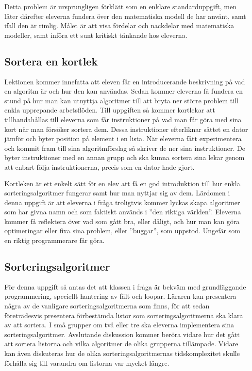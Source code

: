     \textcolor{lila}{Detta problem är ursprungligen förklätt som en enklare standarduppgift, men låter därefter eleverna fundera över den matematiska modell de har använt, samt ifall den är rimlig. Målet är att visa fördelar och nackdelar med matematiska modeller, samt införa ett sunt kritiskt tänkande hos eleverna.}
    
\subsection{Sortera en kortlek}
    \label{sec:Sortera}
    
    \textcolor{WildStrawberry}{
        Lektionen kommer innefatta att eleven får en introducerande beskrivning på vad en algoritm är och hur den kan användas. Sedan kommer eleverna få fundera en stund på hur man kan utnyttja algoritmer till att bryta ner större problem till enkla upprepande arbetsflöden. Till uppgiften så kommer kortlekar att tillhandahållas till eleverna som får instruktioner på vad man får göra med sina kort när man försöker sortera dem. Dessa instruktioner efterliknar sättet en dator jämför och byter position på element i en lista. När eleverna fått experimentera och kommit fram till sina algoritmförslag så skriver de ner sina instruktioner. De byter instruktioner med en annan grupp och ska kunna sortera sina lekar genom att enbart följa instruktionerna, precis som en dator hade gjort.}
        
    \textcolor{WildStrawberry}{
        Kortleken är ett enkelt sätt för en elev att få en god introduktion till hur enkla sorteringsalgoritmer fungerar samt hur man nyttjar sig av dem. Lärdomen i denna uppgift är att eleverna i fråga troligtvis kommer lyckas skapa algoritmer som har givna namn och som faktiskt används i ''den riktiga världen''. Eleverna kommer få reflektera över vad som gått bra, eller dåligt, och hur man kan göra optimeringar eller fixa sina problem, eller ''buggar'', som uppstod. Ungefär som en riktig programmerare får göra. }
        
\subsection{Sorteringsalgoritmer}
    \label{sec:sorteringsalgoritmer}
    
    \textcolor{WildStrawberry}{
        För denna uppgift så antas det att klassen i fråga är bekväm med grundläggande programmering, speciellt hantering av fält och loopar. Läraren kan presentera några av de vanligare sorteringsalgoritmerna som finns, för att sedan företrädesvis presentera förbestämda listor som sorteringsalgoritmerna ska klara av att sortera. I små grupper om två eller tre ska eleverna implementera sina sorteringsalgoritmer. Avslutande diskussion kommer beröra vidare hur det gått att sortera listorna och vilka algoritmer de olika grupperna tillämpade. Vidare kan även diskuteras hur de olika sorteringsalgoritmernas tidskomplexitet skulle förhålla sig till varandra om listorna var mycket längre.}
        
